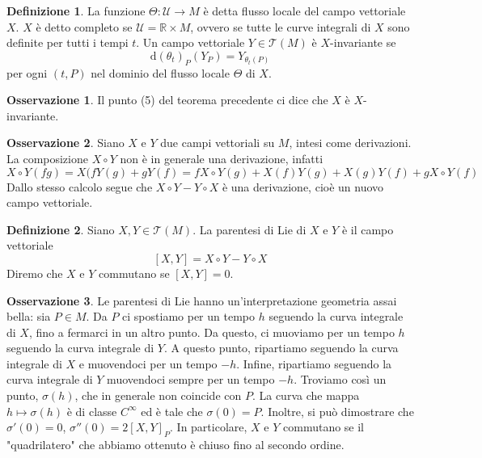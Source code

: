 \documentclass[a4paper,11pt]{article}
\theoremstyle{definition}
\newtheorem{osservazione}{Osservazione}[section]
\newtheorem{definizione}{Definizione}[section]
\theoremstyle{theorem}
\begin{document}
\begin{definizione}
	La funzione $\Theta\colon\mathcal{U}\to M$ è detta flusso locale del campo vettoriale $X$. $X$ è detto completo se $\mathcal{U}=\mathbb{R}\times M$, ovvero se tutte le curve integrali di $X$ sono definite per tutti i tempi $t$. Un campo vettoriale $Y\in\mathcal{T}(M)$ è $X$-invariante se
	\[\mathrm{d}\left(\theta_t\right)_P(Y_P)=Y_{\theta_t(P)}\]
	per ogni $(t,P)$ nel dominio del flusso locale $\Theta$ di $X$.
\end{definizione}
\begin{osservazione}
	Il punto (5) del teorema precedente ci dice che $X$ è $X$-invariante.
\end{osservazione}
\begin{osservazione}
	Siano $X$ e $Y$ due campi vettoriali su $M$, intesi come derivazioni. La composizione $X\circ Y$ non è in generale una derivazione, infatti
	\[X\circ Y(fg)=X(fY(g)+gY(f)=fX\circ Y(g)+X(f)Y(g)+X(g)Y(f)+gX\circ Y(f)\]
	Dallo stesso calcolo segue che $X\circ Y-Y\circ X$ è una derivazione, cioè un nuovo campo vettoriale.
\end{osservazione}
\begin{definizione}
	Siano $X,Y\in\mathcal{T}(M)$. La parentesi di Lie di $X$ e $Y$ è il campo vettoriale
	\[[X,Y]=X\circ Y-Y\circ X\]	
	Diremo che $X$ e $Y$ commutano se $[X,Y]=0$.
\end{definizione}
\begin{osservazione}
	Le parentesi di Lie hanno un'interpretazione geometria assai bella: sia $P\in M$. Da $P$ ci spostiamo per un tempo $h$ seguendo la curva integrale di $X$, fino a fermarci in un altro punto. Da questo, ci muoviamo per un tempo $h$ seguendo la curva integrale di $Y$. A questo punto, ripartiamo seguendo la curva integrale di $X$ e muovendoci per un tempo $-h$. Infine, ripartiamo seguendo la curva integrale di $Y$ muovendoci sempre per un tempo $-h$. Troviamo così un punto, $\sigma(h)$, che in generale non coincide con $P$. La curva che mappa $h\mapsto\sigma(h)$ è di classe $C^\infty$ ed è tale che $\sigma(0)=P$. Inoltre, si può dimostrare che $\sigma'(0)=0$, $\sigma''(0)=2[X,Y]_P$. In particolare, $X$ e $Y$ commutano se il "quadrilatero" che abbiamo ottenuto è chiuso fino al secondo ordine.
\end{osservazione}
\end{document}
